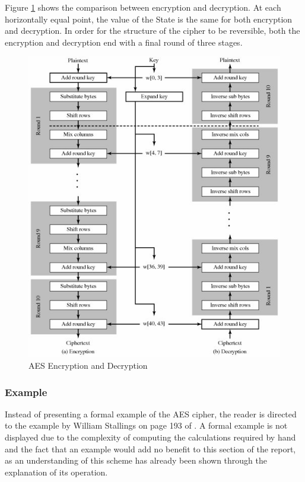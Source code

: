 \documentclass[a4paper,10pt]{report}
\begin{document}
Figure \ref{fig:decrypt1} shows the comparison between encryption and decryption. At each horizontally equal point, the value of the State is the same for both encryption and decryption. In order for the structure of the cipher to be reversible, both the encryption and decryption end with a final round of three stages. 

\begin{figure}[htb]
\centering
\includegraphics[scale=0.7]{images/decrypt1.jpg}
\caption{AES Encryption and Decryption}
\label{fig:decrypt1}
\end{figure}

\subsubsection{Example}

Instead of presenting a formal example of the AES cipher, the reader is directed to the example by William Stallings on page 193 of \cite{willstallings}. A formal example is not displayed due to the complexity of computing the calculations required by hand and the fact that an example would add no benefit to this section of the report, as an understanding of this scheme has already been shown through the explanation of its operation. 
\end{document}
